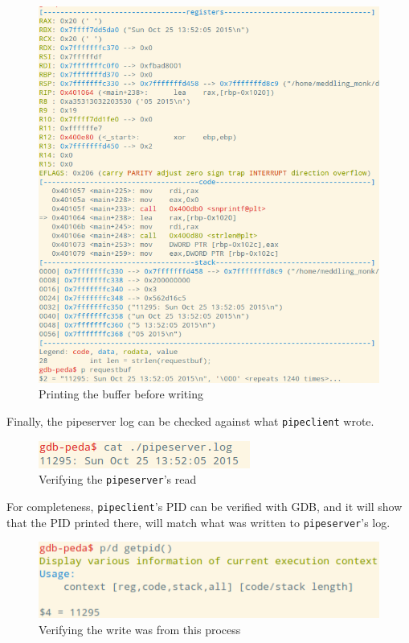 \documentclass[letter,12pt,sffamily]{article}
\begin{document}
\begin{figure}[H]
	\centering
	\includegraphics[width=1\linewidth]{./images/19}
	\caption[printing_buffer]{Printing the buffer before writing}
	\label{fig:20}
\end{figure}
Finally, the pipeserver log can be checked against what \texttt{pipeclient} wrote. 
\begin{figure}[H]
	\centering
	\includegraphics[width=.5\linewidth]{./images/20}
	\caption[verifying_pipeserver_read]{Verifying the \texttt{pipeserver}'s read}
	\label{fig:21}
\end{figure}
For completeness, \texttt{pipeclient}'s PID can be verified with GDB, and it will show that the PID printed there, will match what was written to \texttt{pipeserver}'s log.
\begin{figure}[H]
	\centering
	\includegraphics[width=.7\linewidth]{./images/21}
	\caption[verifying_write_from_current_pid]{Verifying the write was from this process}
	\label{fig:22}
\end{figure}
\end{document}
